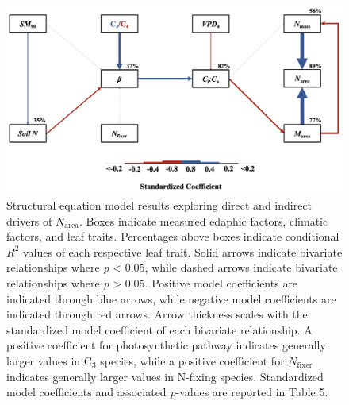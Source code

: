 \newpage
\begin{landscape}
    \begin{figure}
        \centering
        \includegraphics[scale = 0.3]{ch4_TXeco/figs/TXeco_fig5_SEM.png}
        \caption[Structural equation model results exploring direct and indirect drivers of $N_\mathrm{area}$]{Structural equation model results exploring direct and indirect drivers of $N_\mathrm{area}$. Boxes indicate measured edaphic factors, climatic factors, and leaf traits. Percentages above boxes indicate conditional $R^{2}$ values of each respective leaf trait. Solid arrows indicate bivariate relationships where \textit{p} < 0.05, while dashed arrows indicate bivariate relationships where \textit{p} > 0.05. Positive model coefficients are indicated through blue arrows, while negative model coefficients are indicated through red arrows. Arrow thickness scales with the standardized model coefficient of each bivariate relationship. A positive coefficient for photosynthetic pathway indicates generally larger values in C$_3$ species, while a positive coefficient for $N_\mathrm{fixer}$ indicates generally larger values in N-fixing species. Standardized model coefficients and associated \textit{p}-values are reported in Table 5.}
        \label{fig:figure4.5}
    \end{figure}
\end{landscape}
\clearpage

